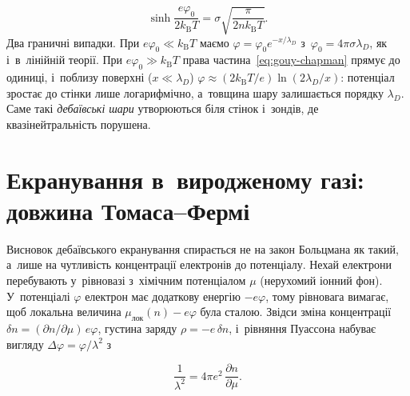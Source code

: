 \begin{equation*}
	\sinh\frac{e\varphi_0}{2k_{\mathrm B}T}=\sigma\sqrt{\frac{\pi}{2nk_{\mathrm B}T}}.
\end{equation*}
Два граничні випадки. При $e\varphi_0\ll k_{\mathrm B}T$ маємо
$\varphi=\varphi_0e^{-x/\lambda_D}$ з~$\varphi_0=4\pi\sigma\lambda_D$, як і~в~лінійній
теорії. При $e\varphi_0\gg k_{\mathrm B}T$ права частина~\eqref{eq:gouy-chapman} прямує до
одиниці, і~поблизу поверхні ($x\ll\lambda_D$) $\varphi\approx(2k_{\mathrm
B}T/e)\ln(2\lambda_D/x)$: потенціал зростає до стінки лише логарифмічно, а~товщина шару
залишається порядку $\lambda_D$. Саме такі \emph{дебаївські шари} утворюються біля стінок
і~зондів, де квазінейтральність порушена.



\section{Екранування в~виродженому газі: довжина Томаса--Фермі}\label{sec:thomas-fermi}



Висновок дебаївського екранування спирається не на закон Больцмана як такий, а~лише на
чутливість концентрації електронів до потенціалу. Нехай електрони перебувають у~рівновазі
з~хімічним потенціалом $\mu$ (нерухомий іонний фон). У~потенціалі $\varphi$ електрон має
додаткову енергію $-e\varphi$, тому рівновага вимагає, щоб локальна величина
$\mu_{\mathrm{лок}}(n)-e\varphi$ була сталою. Звідси зміна концентрації $\delta
n=(\partial n/\partial\mu)\,e\varphi$, густина заряду $\rho=-e\,\delta n$, і~рівняння
Пуассона набуває вигляду $\Delta\varphi=\varphi/\lambda^2$ з

\begin{equation}\label{eq:screening-general}
	\frac1{\lambda^2}=4\pi e^2\,\frac{\partial n}{\partial\mu}.
\end{equation}

